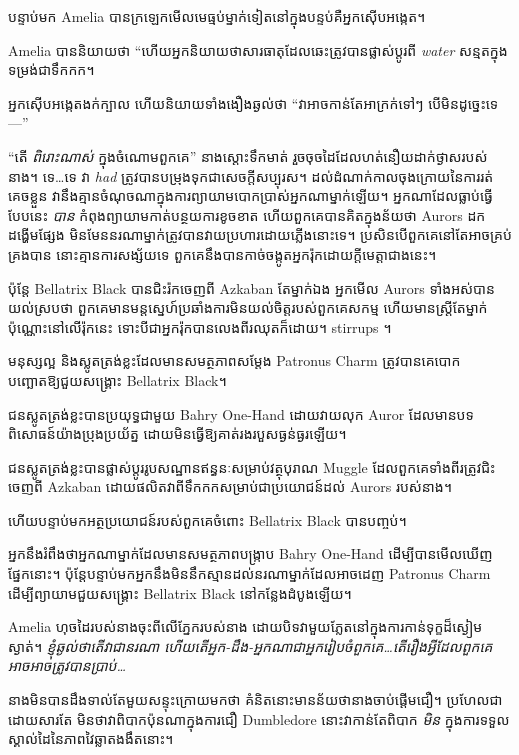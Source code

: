 {{{{{បន្ទាប់មក Amelia បានក្រឡេកមើលមេធ្មប់ម្នាក់ទៀតនៅក្នុងបន្ទប់គឺអ្នកស៊ើបអង្កេត។

Amelia បាន​និយាយ​ថា “ហើយ​អ្នក​និយាយ​ថា​សារធាតុ​ដែល​ឆេះ​ត្រូវ​បាន​ផ្លាស់​ប្តូរ​ពី \emph{water} សន្មត​ក្នុង​ទម្រង់​ជា​ទឹកកក។

អ្នកស៊ើបអង្កេតងក់ក្បាល ហើយនិយាយទាំងងឿងឆ្ងល់ថា “វាអាចកាន់តែអាក្រក់ទៅៗ បើមិនដូច្នេះទេ—”

“តើ \emph{ពិរោះណាស់} ក្នុងចំណោមពួកគេ” នាងស្ដោះទឹកមាត់ រួចចុចដៃដែលហត់នឿយដាក់ថ្ងាសរបស់នាង។ ទេ…ទេ វា \emph{had} ត្រូវបានបម្រុងទុកជាសេចក្តីសប្បុរស។ ដល់​ដំណាក់​កាល​ចុង​ក្រោយ​នៃ​ការ​រត់​គេច​ខ្លួន វា​នឹង​គ្មាន​ចំណុច​ណា​ក្នុង​ការ​ព្យាយាម​បោក​ប្រាស់​អ្នក​ណា​ម្នាក់​ឡើយ។ អ្នកណាដែលធ្លាប់ធ្វើបែបនេះ \emph{បាន} កំពុងព្យាយាមកាត់បន្ថយការខូចខាត ហើយពួកគេបានគិតក្នុងន័យថា Aurors ដកដង្ហើមផ្សែង មិនមែននរណាម្នាក់ត្រូវបានវាយប្រហារដោយភ្លើងនោះទេ។ ប្រសិនបើ​ពួកគេ​នៅតែ​អាច​គ្រប់គ្រង​បាន នោះ​គ្មាន​ការសង្ស័យ​ទេ ពួកគេ​នឹង​បាន​កាច់​ចង្កូត​អ្នក​រ៉ុក​ដោយ​ក្តីមេត្តា​ជាង​នេះ​។

ប៉ុន្តែ Bellatrix Black បានជិះរ៉កចេញពី Azkaban តែម្នាក់ឯង អ្នកមើល Aurors ទាំងអស់បានយល់ស្របថា ពួកគេមានមន្តស្នេហ៍ប្រឆាំងការមិនយល់ចិត្តរបស់ពួកគេសកម្ម ហើយមានស្ត្រីតែម្នាក់ប៉ុណ្ណោះនៅលើរ៉ុកនេះ ទោះបីជាអ្នករ៉ុកបានលេងពីរឈុតក៏ដោយ។ stirrups ។

មនុស្សល្អ និងស្លូតត្រង់ខ្លះដែលមានសមត្ថភាពសម្ដែង Patronus Charm ត្រូវបានគេបោកបញ្ឆោតឱ្យជួយសង្គ្រោះ Bellatrix Black។

ជនស្លូតត្រង់ខ្លះបានប្រយុទ្ធជាមួយ Bahry One-Hand ដោយវាយលុក Auror ដែលមានបទពិសោធន៍យ៉ាងប្រុងប្រយ័ត្ន ដោយមិនធ្វើឱ្យគាត់រងរបួសធ្ងន់ធ្ងរឡើយ។

ជនស្លូតត្រង់ខ្លះបានផ្លាស់ប្តូររូបសណ្ឋានឥន្ធនៈសម្រាប់វត្ថុបុរាណ Muggle ដែលពួកគេទាំងពីរត្រូវជិះចេញពី Azkaban ដោយផលិតវាពីទឹកកកសម្រាប់ជាប្រយោជន៍ដល់ Aurors របស់នាង។

ហើយបន្ទាប់មកអត្ថប្រយោជន៍របស់ពួកគេចំពោះ Bellatrix Black បានបញ្ចប់។

អ្នក​នឹង​រំពឹង​ថា​អ្នក​ណា​ម្នាក់​ដែល​មាន​សមត្ថភាព​បង្ក្រាប Bahry One-Hand ដើម្បី​បាន​មើល​ឃើញ​ផ្នែក​នោះ។ ប៉ុន្តែបន្ទាប់មកអ្នកនឹងមិននឹកស្មានដល់នរណាម្នាក់ដែលអាចដេញ Patronus Charm ដើម្បីព្យាយាមជួយសង្គ្រោះ Bellatrix Black នៅកន្លែងដំបូងឡើយ។

Amelia ហុចដៃរបស់នាងចុះពីលើភ្នែករបស់នាង ដោយបិទវាមួយភ្លែតនៅក្នុងការកាន់ទុក្ខដ៏ស្ងៀមស្ងាត់។ \emph{ខ្ញុំឆ្ងល់ថាតើវាជានរណា ហើយតើអ្នក-ដឹង-អ្នកណាជាអ្នករៀបចំពួកគេ…តើរឿងអ្វីដែលពួកគេអាច\emph{អាច}ត្រូវបានប្រាប់…}

នាង​មិន​បាន​ដឹង​ទាល់​តែ​មួយ​សន្ទុះ​ក្រោយ​មក​ថា គំនិត​នោះ​មាន​ន័យ​ថា​នាង​ចាប់​ផ្ដើម​ជឿ។ ប្រហែលជាដោយសារតែ មិនថាវាពិបាកប៉ុនណាក្នុងការជឿ Dumbledore នោះវាកាន់តែពិបាក \emph{មិន} ក្នុងការទទួលស្គាល់ដៃនៃភាពវៃឆ្លាតងងឹតនោះ។

}}}}}

